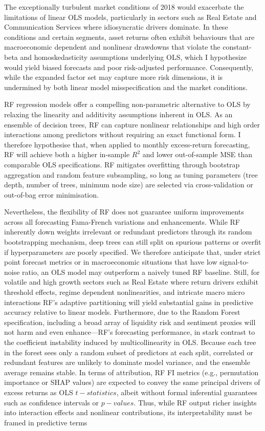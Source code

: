 The exceptionally turbulent market conditions of 2018 would exacerbate the limitations of linear OLS models, particularly in sectors such as Real Estate and Communication Services where idiosyncratic drivers dominate. In these conditions and certain segments, asset returns often exhibit behaviours that are macroeconomic dependent and nonlinear drawdowns that violate the constant-beta and homoskedasticity assumptions underlying OLS, which I hypothesize would yield biased forecasts and poor risk-adjusted performance. Consequently, while the expanded factor set may capture more risk dimensions, it is undermined by both linear model misspecification and the market conditions.

RF regression models offer a compelling non-parametric alternative to OLS by relaxing the linearity and additivity assumptions inherent in OLS. As an ensemble of decision trees, RF can capture nonlinear relationships and high order interactions among predictors without requiring an exact functional form. I therefore hypothesise that, when applied to monthly excess-return forecasting, RF will achieve both a higher in-sample $R^2$ and lower out-of-sample MSE than comparable OLS specifications. RF mitigates overfitting through bootstrap aggregation and random feature subsampling, so long as tuning parameters (tree depth, number of trees, minimum node size) are selected via cross-validation or out-of-bag error minimisation.

Nevertheless, the flexibility of RF does not guarantee uniform improvements across all forecasting Fama-French variations and enhancements. While RF inherently down weights irrelevant or redundant predictors through its random bootstrapping mechanism, deep trees can still split on spurious patterns or overfit if hyperparameters are poorly specified. We therefore anticipate that, under strict point forecast metrics or in macroeconomic situations that have low signal-to-noise ratio, an OLS model may outperform a naively tuned RF baseline. Still, for volatile and high growth sectors such as Real Estate where return drivers exhibit threshold effects, regime dependent nonlinearities, and intricate macro micro interactions RF's adaptive partitioning will yield substantial gains in predictive accuracy relative to linear models. Furthermore, due to the Random Forest specification, including a broad array of liquidity risk and sentiment proxies will not harm and even enhance—RF's forecasting performance, in stark contrast to the coefficient instability induced by multicollinearity in OLS. Because each tree in the forest sees only a random subset of predictors at each split, correlated or redundant features are unlikely to dominate model variance, and the ensemble average remains stable. In terms of attribution, RF FI metrics (e.g., permutation importance or SHAP values) are expected to convey the same principal drivers of excess returns as OLS $t-statistics$, albeit without formal inferential guarantees such as confidence intervals or $p-values$. Thus, while RF output richer insights into interaction effects and nonlinear contributions, its interpretability must be framed in predictive terms

